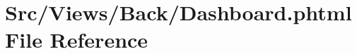 \hypertarget{_dashboard_8phtml}{}\section{Src/\+Views/\+Back/\+Dashboard.phtml File Reference}
\label{_dashboard_8phtml}
